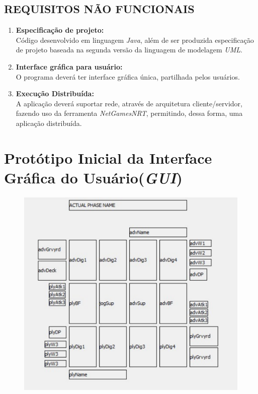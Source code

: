 \documentclass[12pt,a4paper,brazil,abntex2]{article}
\begin{document}
	\subsection{\normalsize REQUISITOS NÃO FUNCIONAIS}
		
		\begin{enumerate}

			\item {\bf Especificação de projeto:}\\Código desenvolvido em linguagem \textit{Java}, além de ser produzida especificação de projeto baseada na segunda versão da linguagem de modelagem \textit{UML}.

			\item {\bf Interface gráfica para usuário:}\\O programa deverá ter interface gráfica única, partilhada pelos usuários.
			
			\item {\bf Execução Distribuída:}\\ A aplicação deverá suportar rede, através de arquitetura cliente/servidor, fazendo uso da ferramenta \textit{NetGamesNRT}, permitindo, dessa forma, uma aplicação distribuída.
		\end{enumerate}
\newpage

\section{\normalsize Protótipo Inicial da Interface Gráfica do Usuário(\textit{GUI})}
	\begin{figure}[h]
	\includegraphics[scale=1]{Prototipo-GUI.pdf}
	\end{figure}
\end{document}
